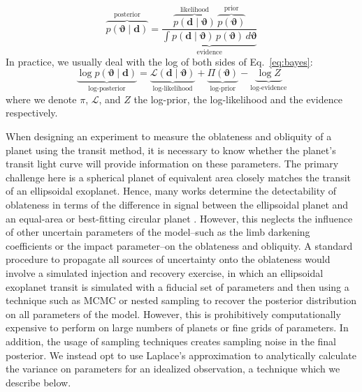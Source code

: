 \documentclass[twocolumn]{aastex631}
\begin{document}
\begin{equation} \label{eq:bayes}
\overbrace{p(\boldsymbol{\vartheta} \mid \mathbf{d})}^{\text{posterior}} = \frac{\overbrace{p(\mathbf{d} \mid \boldsymbol{\vartheta})}^{\text{likelihood}} \, \overbrace{p(\boldsymbol{\vartheta})}^{\text{prior}}}{\underbrace{\int p(\mathbf{d} \mid \boldsymbol{\vartheta}) \, p(\boldsymbol{\vartheta}) \, d\boldsymbol{\vartheta}}_{\text{evidence}}}
\end{equation}
In practice, we usually deal with the log of both sides of Eq.~\ref{eq:bayes}: 
\begin{equation} \label{eq:logbayes}
    \underbrace{\log p(\boldsymbol{\vartheta} \mid \mathbf{d})}_{\text{log-posterior}} = \underbrace{\mathcal{L}(\mathbf{d} \mid \boldsymbol{\vartheta})}_{\text{log-likelihood}} + \underbrace{\Pi(\boldsymbol{\vartheta})}_{\text{log-prior}} - \underbrace{\log Z}_{\text{log-evidence}}
\end{equation}
where we denote $\pi$, $\mathcal{L}$, and $Z$ the log-prior, the log-likelihood and the evidence respectively.

When designing an experiment to measure the oblateness and obliquity of a planet using the transit method, it is necessary to know whether the planet's transit light curve will provide information on these parameters. The primary challenge here is a spherical planet of equivalent area closely matches the transit of an ellipsoidal exoplanet. Hence, many works determine the detectability of oblateness in terms of the difference in signal between the ellipsoidal planet and an equal-area or best-fitting circular planet \citep{seager2002a, barnes2003, carter2010a, zhu2014}. However, this neglects the influence of other uncertain parameters of the model--such as the limb darkening coefficients or the impact parameter--on the oblateness and obliquity. A standard procedure to propagate all sources of uncertainty onto the oblateness would involve a simulated injection and recovery exercise, in which an ellipsoidal exoplanet transit is simulated with a fiducial set of parameters and then using a technique such as MCMC or nested sampling to recover the posterior distribution on all parameters of the model. However, this is prohibitively computationally expensive to perform on large numbers of planets or fine grids of parameters. In addition, the usage of sampling techniques creates sampling noise in the final posterior. We instead opt to use Laplace's approximation to analytically calculate the variance on parameters for an idealized observation, a technique which we describe below. 
\end{document}
